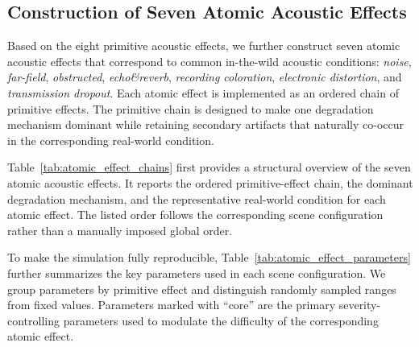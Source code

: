 \documentclass{llmxive}
\begin{document}
\subsection{Construction of Seven Atomic Acoustic Effects}

Based on the eight primitive acoustic effects, we further construct seven
atomic acoustic effects that correspond to common in-the-wild acoustic
conditions: \textit{noise}, \textit{far-field}, \textit{obstructed},
\textit{echo\&reverb}, \textit{recording coloration},
\textit{electronic distortion}, and \textit{transmission dropout}. Each atomic
effect is implemented as an ordered chain of primitive effects. The primitive
chain is designed to make one degradation mechanism dominant while retaining
secondary artifacts that naturally co-occur in the corresponding real-world
condition.

Table~\ref{tab:atomic_effect_chains} first provides a structural overview of the
seven atomic acoustic effects. It reports the ordered primitive-effect chain,
the dominant degradation mechanism, and the representative real-world condition
for each atomic effect. The listed order follows the corresponding scene
configuration rather than a manually imposed global order.

To make the simulation fully reproducible, Table~\ref{tab:atomic_effect_parameters}
further summarizes the key parameters used in each scene configuration. We group
parameters by primitive effect and distinguish randomly sampled ranges from
fixed values. Parameters marked with ``core'' are the primary severity-controlling
parameters used to modulate the difficulty of the corresponding atomic effect.
\end{document}
